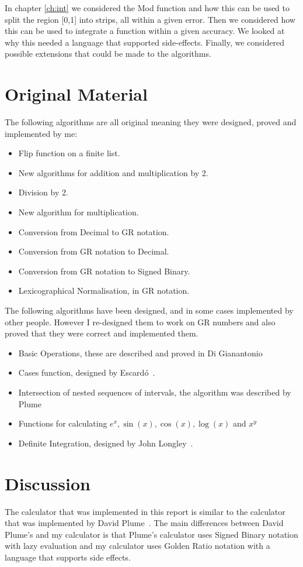\documentclass{cs4rep}
\begin{document}
In chapter \ref{ch:int} we considered the Mod function and how this
can be used to split the region [0,1] into strips, all within a given
error. Then we considered how this can be used to integrate a function
within a given accuracy. We looked at why this needed a language that
supported side-effects. Finally, we considered possible extensions
that could be made to the algorithms.


\section{Original Material}
The following algorithms are all original meaning they were designed,
proved and implemented by me:

\begin{itemize}
\item Flip function on a finite list.
\item New algorithms for addition and multiplication by 2.
\item Division by 2.
\item New algorithm for multiplication.
\item Conversion from Decimal to GR notation.
\item Conversion from GR notation to Decimal.
\item Conversion from GR notation to Signed Binary.
\item Lexicographical Normalisation, in GR notation.
\end{itemize}

The following algorithms have been designed, and in some cases
implemented by other people. However I re-designed them to work on GR
numbers and also proved that they were correct and implemented them.

\begin{itemize}
\item Basic Operations, these are described and proved in Di
  Gianantonio~\cite{kn:DiGianantonio}
\item Cases function, designed by Escard\'o~\cite{kn:Escardo}.
\item Intersection of nested sequences of intervals, the algorithm was
  described by Plume~\cite{kn:Plume}
\item Functions for calculating $e^{x}, \sin(x), \cos(x), \log(x)$ and
  $x^{y}$
\item Definite Integration, designed by John Longley~\cite{kn:Longley}.
\end{itemize}

\section{Discussion}
The calculator that was implemented in this report is similar to the
calculator that was implemented by David Plume~\cite{kn:Plume}. The
main differences between David Plume's and my calculator is that Plume's
calculator uses Signed Binary notation with lazy evaluation and my
calculator uses Golden Ratio notation with a language that supports side effects.
\end{document}
